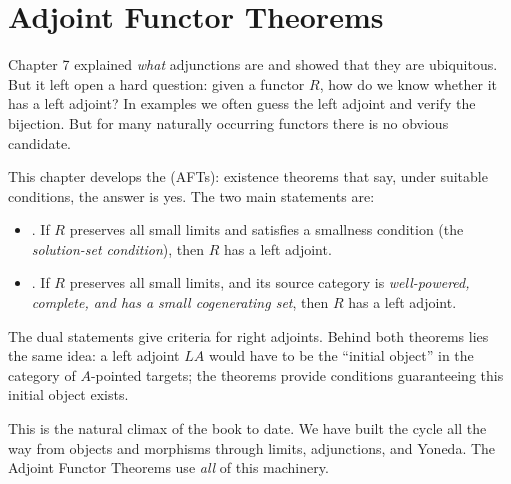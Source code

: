 \chapter{Adjoint Functor Theorems}

\begin{overviewbox}
Chapter 7 explained \emph{what} adjunctions are and showed that they are
ubiquitous. But it left open a hard question: given a functor $R$, how do
we know whether it has a left adjoint? In examples we often guess the
left adjoint and verify the bijection. But for many naturally occurring
functors there is no obvious candidate.

This chapter develops the  (AFTs):
existence theorems that say, under suitable conditions, the answer is
yes. The two main statements are:

\begin{itemize}
  \item {}.\quad
        If $R$ preserves all small limits and satisfies a smallness
        condition (the \emph{solution-set condition}), then $R$ has a
        left adjoint.
  \item {}.\quad
        If $R$ preserves all small limits, and its source category is
        \emph{well-powered, complete, and has a small cogenerating set},
        then $R$ has a left adjoint.
\end{itemize}

The dual statements give criteria for right adjoints. Behind both
theorems lies the same idea: a left adjoint $L A$ would have to be the
``initial object'' in the category of $A$-pointed targets; the theorems
provide conditions guaranteeing this initial object exists.

This is the natural climax of the book to date. We have built the cycle
all the way from objects and morphisms through limits, adjunctions, and
Yoneda. The Adjoint Functor Theorems use \emph{all} of this machinery.
\end{overviewbox}


